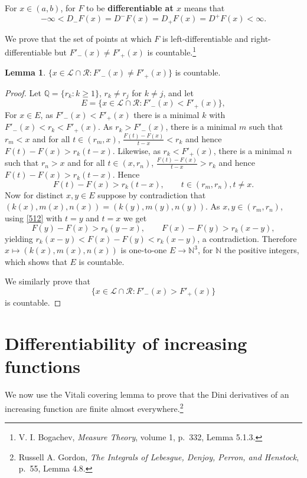 \documentclass{article}
\theoremstyle{definition}
\newtheorem{lemma}[theorem]{Lemma}
\theoremstyle{definition}
\begin{document}
For $x \in (a,b)$, for $F$ to be \textbf{differentiable at $x$} means that
\[
-\infty<D_-F(x) = D^-F(x) = D_+F(x) = D^+F(x) <\infty.
\]


We prove that the set of points at which $F$ is  left-differentiable and right-differentiable
but $F'_-(x) \neq F'_+(x)$ is countable.\footnote{V. I. Bogachev, {\em Measure Theory}, volume 1, p.~332, Lemma 5.1.3.}

\begin{lemma}
$\{x \in \mathscr{L} \cap \mathscr{R}: F'_-(x) \neq F'_+(x)\}$ is countable.
\end{lemma}
\begin{proof}
Let $\mathbb{Q}=\{r_k: k \geq 1\}$, $r_k \neq r_j$ for $k \neq j$, and
let
\[
E=\{x \in \mathscr{L} \cap \mathscr{R}: F'_-(x)<F'_+(x)\},
\]
For $x \in E$, as $F'_-(x)<F'_+(x)$ there is a minimal $k$ with $F'_-(x)<r_k<F'_+(x)$. 
As $r_k > F'_-(x)$, there is a minimal $m$ such that $r_m<x$ and for all
$t \in (r_m,x)$, $\frac{F(t)-F(x)}{t-x}<r_k$
and hence $F(t)-F(x)>r_k(t-x)$. 
 Likewise,
as $r_k<F'_+(x)$, there is a minimal $n$ such that $r_n>x$ and for all
$t \in (x,r_n)$, $\frac{F(t)-F(x)}{t-x}>r_k$ and hence $F(t)-F(x)>r_k(t-x)$. 
Hence
\begin{equation}
F(t)-F(x)>r_k(t-x),\qquad  t \in (r_m,r_n), t \neq x.
\label{512} 
\end{equation}
Now for distinct $x,y \in E$ suppose by contradiction 
that $(k(x),m(x),n(x)) = (k(y),m(y),n(y))$. 
As $x,y \in (r_m,r_n)$, using \eqref{512} with $t=y$ and $t=x$ we get
\[
F(y)-F(x)>r_k(y-x),\qquad F(x)-F(y)>r_k(x-y),
\]
yielding $r_k(x-y)<F(x)-F(y)<r_k(x-y)$, a contradiction. 
Therefore $x \mapsto (k(x),m(x),n(x))$ is one-to-one
$E \to \mathbb{N}^3$, for $\mathbb{N}$ the positive integers, which shows
that $E$ is countable.


We similarly prove that
\[
\{x \in \mathscr{L} \cap \mathscr{R}: F'_-(x)>F'_+(x)\}
\]
is countable. 
\end{proof}




\section{Differentiability of increasing functions}
We now use the Vitali covering lemma to prove that the Dini derivatives of an increasing function are finite almost everywhere.\footnote{Russell A. Gordon, {\em The Integrals of Lebesgue, Denjoy, Perron, and Henstock}, p.~55, Lemma 4.8.}
\end{document}
